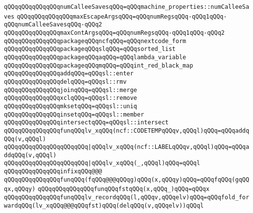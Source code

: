 \verb|qQQqqQQqqQQqqQQqnumCalleeSavesqQQq=qQQqmachine_properties::numCalleeSaves|\newline
\newline
\verb|qQQqqQQqqQQqqQQqmaxEscapeArgsqQQq=qQQqnumRegsqQQq-qQQq1qQQq-qQQqnumCalleeSavesqQQq-qQQq2|\newline
\verb|qQQqqQQqqQQqqQQqmaxContArgsqQQq=qQQqnumRegsqQQq-qQQq1qQQq-qQQq2|\newline
\newline
\verb|qQQqqQQqqQQqqQQqpackageqQQqncfqQQq=qQQqnextcode_form|\newline
\verb|qQQqqQQqqQQqqQQqpackageqQQqslqQQq=qQQqsorted_list|\newline
\verb|qQQqqQQqqQQqqQQqpackageqQQqaqQQq=qQQqlambda_variable|\newline
\verb|qQQqqQQqqQQqqQQqpackageqQQqmqQQq=qQQqint_red_black_map|\newline
\newline
\verb|qQQqqQQqqQQqqQQqaddqQQq=qQQqsl::enter|\newline
\verb|qQQqqQQqqQQqqQQqdelqQQq=qQQqsl::rmv|\newline
\verb|qQQqqQQqqQQqqQQqjoinqQQq=qQQqsl::merge|\newline
\verb|qQQqqQQqqQQqqQQqxclqQQq=qQQqsl::remove|\newline
\verb|qQQqqQQqqQQqqQQqmksetqQQq=qQQqsl::uniq|\newline
\verb|qQQqqQQqqQQqqQQqinsetqQQq=qQQqsl::member|\newline
\verb|qQQqqQQqqQQqqQQqintersectqQQq=qQQqsl::intersect|\newline
\newline
\verb|qQQqqQQqqQQqqQQqfunqQQqlv_xqQQq(ncf::CODETEMPqQQqv,qQQql)qQQq=qQQqaddqQQq(v,qQQql)|\newline
\verb|qQQqqQQqqQQqqQQqqQQqqQQq|\verb#|qQQqlv_xqQQq(ncf::LABELqQQqv,qQQql)qQQq=qQQqaddqQQq(v,qQQql)#\newline
\verb|qQQqqQQqqQQqqQQqqQQqqQQq|\verb#|qQQqlv_xqQQq(_,qQQql)qQQq=qQQql#\newline
\newline
\verb|qQQqqQQqqQQqqQQqinfixqQQq@@@|\newline
\verb|qQQqqQQqqQQqqQQqfunqQQq(fqQQq@@@qQQqg)qQQq(x,qQQqy)qQQq=qQQqfqQQq(gqQQqx,qQQqy)|\newline
\verb|qQQqqQQqqQQqqQQqfunqQQqfstqQQq(x,qQQq_)qQQq=qQQqx|\newline
\newline
\verb|qQQqqQQqqQQqqQQqfunqQQqlv_recordqQQq(l,qQQqv,qQQqelv)qQQq=qQQqfold_forwardqQQq(lv_xqQQq@@@qQQqfst)qQQq(delqQQq(v,qQQqelv))qQQql|\newline
